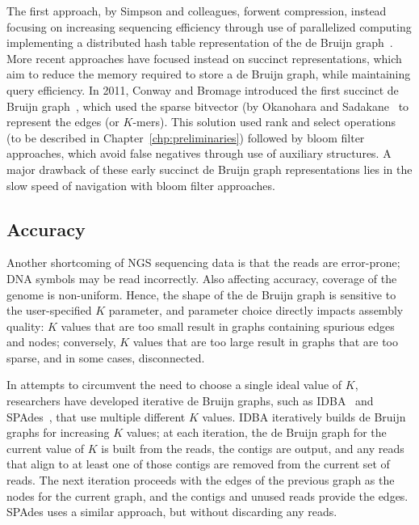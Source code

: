 The first approach, by Simpson and colleagues, forwent compression, instead focusing on increasing sequencing efficiency through use of parallelized computing implementing a distributed hash table representation of the de Bruijn graph~\cite{SimWon09}.
More recent approaches have focused instead on succinct representations, which aim to reduce the memory required to store a de Bruijn graph,
while maintaining query efficiency. In 2011, Conway and Bromage introduced the first succinct de Bruijn graph~\cite{conway},
which used the sparse bitvector (by Okanohara and Sadakane~\cite{OkaSad07}%
 to represent the edges (or $K$-mers). This solution
used rank and select operations (to be described in Chapter~\ref{chp:preliminaries}) followed by
bloom filter approaches, which avoid false negatives through use of auxiliary structures. A major drawback of these early succinct de Bruijn graph representations lies in the slow speed of navigation with bloom filter approaches. %


\subsection{Accuracy}
Another shortcoming of NGS sequencing data is that the reads are error-prone; DNA symbols may be read incorrectly. Also affecting accuracy, coverage of the genome is non-uniform.
Hence, the shape of the de Bruijn graph is sensitive to the user-specified $K$ parameter, and parameter choice directly
impacts assembly quality: $K$ values that are too small result in graphs containing spurious edges and nodes; conversely, $K$ values that are too large result in graphs that are too sparse, and in some cases, disconnected.

In attempts to circumvent the need to choose a single ideal value of $K$, researchers have developed iterative de Bruijn graphs, such as IDBA~\cite{peng2010idba} and SPAdes~\cite{bankevich2012spades}, that
use multiple different $K$ values. IDBA iteratively builds de Bruijn graphs for increasing $K$ values;
at each iteration, the de Bruijn graph for the current value of $K$ is built from the reads, the contigs
are output, and any reads that align to at least one of those contigs are removed from the current set of reads.
The next iteration proceeds with the edges of the previous graph as the nodes for the current graph, and the contigs and
unused reads provide the edges. SPAdes uses a similar approach, but without discarding any reads.

